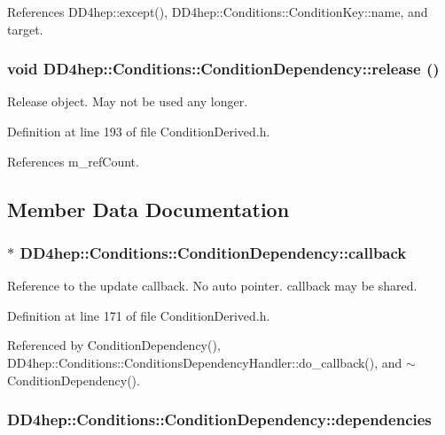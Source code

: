 References DD4hep::except(), DD4hep::Conditions::ConditionKey::name, and target.\hypertarget{class_d_d4hep_1_1_conditions_1_1_condition_dependency_afdaaf31337b8f15156a1b8fad3895107}{
\subsubsection[{release}]{\setlength{\rightskip}{0pt plus 5cm}void DD4hep::Conditions::ConditionDependency::release ()}}
\label{class_d_d4hep_1_1_conditions_1_1_condition_dependency_afdaaf31337b8f15156a1b8fad3895107}


Release object. May not be used any longer. 

Definition at line 193 of file ConditionDerived.h.

References m\_\-refCount.

\subsection{Member Data Documentation}
\hypertarget{class_d_d4hep_1_1_conditions_1_1_condition_dependency_aa90b6ad647f576574502b6c023b88372}{
\subsubsection[{callback}]{$\ast$ {\bf DD4hep::Conditions::ConditionDependency::callback}}}
\label{class_d_d4hep_1_1_conditions_1_1_condition_dependency_aa90b6ad647f576574502b6c023b88372}


Reference to the update callback. No auto pointer. callback may be shared. 

Definition at line 171 of file ConditionDerived.h.

Referenced by ConditionDependency(), DD4hep::Conditions::ConditionsDependencyHandler::do\_\-callback(), and $\sim$ConditionDependency().\hypertarget{class_d_d4hep_1_1_conditions_1_1_condition_dependency_ac90a62165ff00d712a03d48716521c51}{
\subsubsection[{dependencies}]{ {\bf DD4hep::Conditions::ConditionDependency::dependencies}}}
\label{class_d_d4hep_1_1_conditions_1_1_condition_dependency_ac90a62165ff00d712a03d48716521c51}


